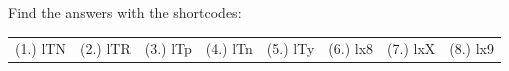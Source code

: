 \begin{eocexercises}{}
\begin{enumerate}[noitemsep, label=\textbf{\arabic*}. ]
\end{enumerate}

\par {} Find the answers with the shortcodes:
\par \begin{tabular}[h]{cccccc}
(1.) lTN  &  (2.) lTR  &  (3.) lTp  &  (4.) lTn  &  (5.) lTy  &  (6.) lx8  &  (7.) lxX  &  (8.) lx9  & \end{tabular}
\end{eocexercises}